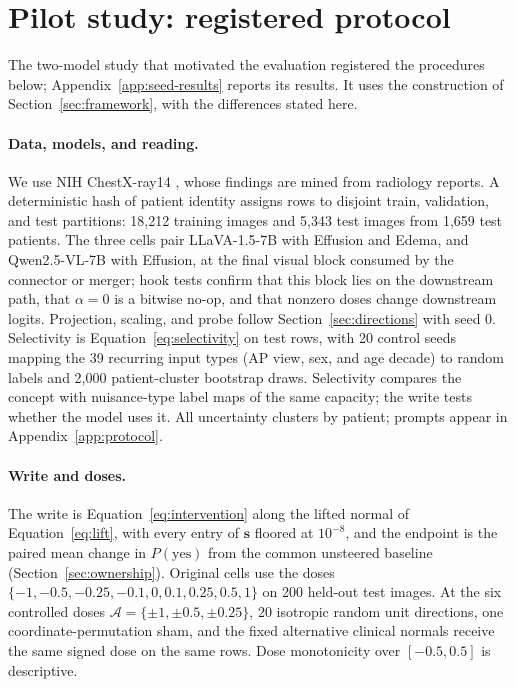 \documentclass{article}
\begin{document}
\section{Pilot study: registered protocol}
\label{app:seed}

The two-model study that motivated the evaluation registered the procedures below; Appendix~\ref{app:seed-results} reports its results. It uses the construction of Section~\ref{sec:framework}, with the differences stated here.

\paragraph{Data, models, and reading.}
We use NIH ChestX-ray14 \citep{wang2017chestxray}, whose findings are mined from radiology reports. A deterministic hash of patient identity assigns rows to disjoint train, validation, and test partitions: 18,212 training images and 5,343 test images from 1,659 test patients. The three cells pair LLaVA-1.5-7B \citep{liu2024improved} with Effusion and Edema, and Qwen2.5-VL-7B \citep{bai2025qwen25vl} with Effusion, at the final visual block consumed by the connector or merger; hook tests confirm that this block lies on the downstream path, that $\alpha=0$ is a bitwise no-op, and that nonzero doses change downstream logits. Projection, scaling, and probe follow Section~\ref{sec:directions} with seed 0. Selectivity is Equation~\ref{eq:selectivity} on test rows, with 20 control seeds mapping the 39 recurring input types (AP view, sex, and age decade) to random labels and 2,000 patient-cluster bootstrap draws. Selectivity compares the concept with nuisance-type label maps of the same capacity; the write tests whether the model uses it. All uncertainty clusters by patient; prompts appear in Appendix~\ref{app:protocol}.

\paragraph{Write and doses.}
The write is Equation~\ref{eq:intervention} along the lifted normal of Equation~\ref{eq:lift}, with every entry of $\boldsymbol s$ floored at $10^{-8}$, and the endpoint is the paired mean change in $P(\mathrm{yes})$ from the common unsteered baseline (Section~\ref{sec:ownership}). Original cells use the doses $\{-1,-0.5,-0.25,-0.1,0,0.1,0.25,0.5,1\}$ on 200 held-out test images. At the six controlled doses $\mathcal A=\{\pm1,\pm0.5,\pm0.25\}$, 20 isotropic random unit directions, one coordinate-permutation sham, and the fixed alternative clinical normals receive the same signed dose on the same rows. Dose monotonicity over $[-0.5,0.5]$ is descriptive.
\end{document}
